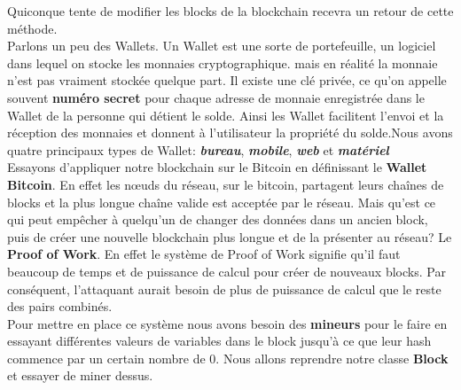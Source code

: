 \documentclass[12pt]{report}
\begin{document}
Quiconque tente de modifier les blocks de la blockchain recevra un retour de cette méthode.\\

\hspace{1cm}Parlons un peu des Wallets. Un Wallet est une sorte de portefeuille, un logiciel dans lequel on stocke les monnaies cryptographique. mais en réalité la monnaie n'est pas vraiment stockée quelque part. Il existe une clé privée, ce qu'on appelle souvent \textbf{numéro secret} pour chaque adresse de monnaie enregistrée dans le Wallet de la personne qui détient le solde. Ainsi les Wallet facilitent l'envoi et la réception des monnaies et donnent à l'utilisateur la propriété du solde.Nous avons quatre principaux types de Wallet: \textbf{\textit{bureau}}, \textbf{\textit{mobile}}, \textbf{\textit{web}} et \textbf{\textit{matériel}}\\

\hspace{1cm} Essayons d'appliquer notre blockchain sur le Bitcoin en définissant le \textbf{Wallet Bitcoin}. En effet les nœuds du réseau, sur le bitcoin, partagent leurs chaînes de blocks et la plus longue chaîne valide est acceptée par le réseau. Mais qu'est ce qui peut empêcher à quelqu'un de changer des données dans un ancien block, puis de créer une nouvelle blockchain plus longue et de la présenter au réseau? Le \textbf{Proof of Work}. En effet le système de Proof of Work signifie qu'il faut beaucoup de temps et de puissance de calcul pour créer de nouveaux blocks. Par conséquent, l'attaquant aurait besoin de plus de puissance de calcul que le reste des pairs combinés.\\

\hspace{1cm} Pour mettre en place ce système nous avons besoin des \textbf{mineurs} pour le faire en essayant différentes valeurs de variables dans le block jusqu'à ce que leur hash commence par un certain nombre de 0. Nous allons reprendre notre classe \textbf{Block} et essayer de miner dessus.
\end{document}
